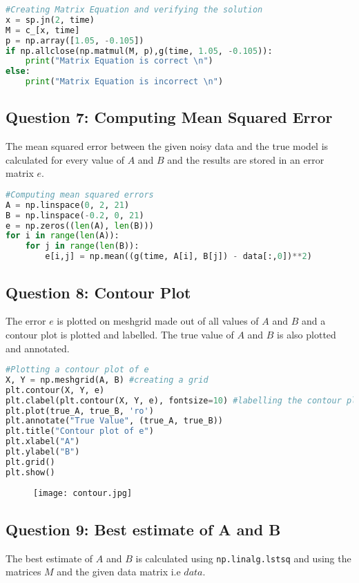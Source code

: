 \documentclass[11pt, a4paper]{article}
\begin{document}
\begin{lstlisting}[language = Python]
#Creating Matrix Equation and verifying the solution
x = sp.jn(2, time)
M = c_[x, time]
p = np.array([1.05, -0.105])
if np.allclose(np.matmul(M, p),g(time, 1.05, -0.105)):
    print("Matrix Equation is correct \n")
else:
    print("Matrix Equation is incorrect \n")
\end{lstlisting}


\subsection{Question 7: Computing Mean Squared Error}
The mean squared error between the given noisy data and the true model is calculated for every value of $A$ and $B$ and the results are stored in an error matrix $e$.\\

\begin{lstlisting}[language = Python]
#Computing mean squared errors
A = np.linspace(0, 2, 21)
B = np.linspace(-0.2, 0, 21)
e = np.zeros((len(A), len(B)))
for i in range(len(A)):
    for j in range(len(B)):
        e[i,j] = np.mean((g(time, A[i], B[j]) - data[:,0])**2)
\end{lstlisting}


\subsection{Question 8: Contour Plot}
The error $e$ is plotted on meshgrid made out of all values of $A$ and $B$ and a contour plot is plotted and labelled. The true value of $A$ and $B$ is also plotted and annotated. \\

\begin{lstlisting}[language = Python]
#Plotting a contour plot of e
X, Y = np.meshgrid(A, B) #creating a grid
plt.contour(X, Y, e)
plt.clabel(plt.contour(X, Y, e), fontsize=10) #labelling the contour plot
plt.plot(true_A, true_B, 'ro')
plt.annotate("True Value", (true_A, true_B))
plt.title("Contour plot of e")
plt.xlabel("A")
plt.ylabel("B")
plt.grid()
plt.show()
\end{lstlisting}

\begin{figure}[H]
     \centering
     \texttt{[image: contour.jpg]}
\end{figure}


\subsection{Question 9: Best estimate of A and B}
The best estimate of $A$ and $B$ is calculated using \texttt{np.linalg.lstsq} and using the matrices $M$ and the given data matrix i.e $data$.\\
\end{document}
